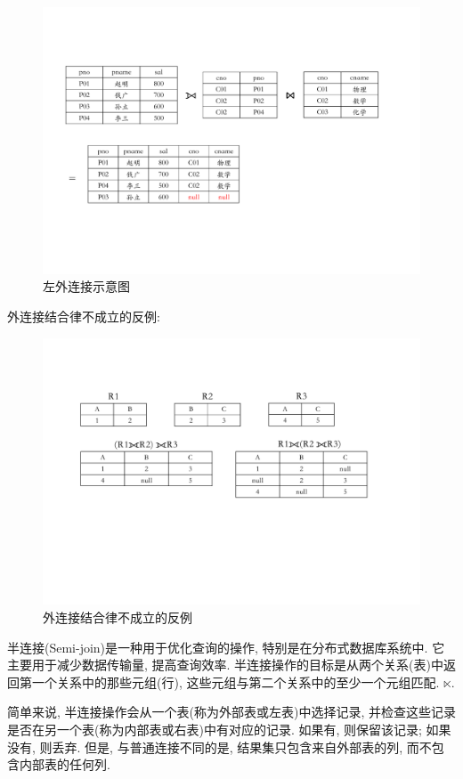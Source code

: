 \begin{figure}[H]
    \centering
    \includegraphics[width=.85\textwidth]{./figure/左外连接.pdf}
    \caption{左外连接示意图}
\end{figure}

外连接结合律不成立的反例:
\begin{figure}[H]
    \centering
    \includegraphics[width=.7\textwidth]{./figure/外连接结合律不成立.pdf}
    \caption{外连接结合律不成立的反例}
\end{figure}

\begin{definition}[半连接]
半连接(Semi-join)是一种用于优化查询的操作, 特别是在分布式数据库系统中. 
它主要用于减少数据传输量, 提高查询效率. 
半连接操作的目标是从两个关系(表)中返回第一个关系中的那些元组(行), 
这些元组与第二个关系中的至少一个元组匹配. $\ltimes$.

简单来说, 半连接操作会从一个表(称为外部表或左表)中选择记录, 
并检查这些记录是否在另一个表(称为内部表或右表)中有对应的记录.
如果有, 则保留该记录; 如果没有, 则丢弃. 
但是, 与普通连接不同的是, 结果集只包含来自外部表的列, 而不包含内部表的任何列.
\end{definition}

